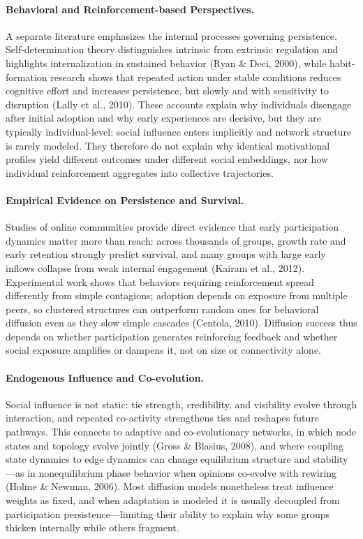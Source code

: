 \documentclass[11pt]{article}
\begin{document}
\paragraph{Behavioral and Reinforcement-based Perspectives.}
A separate literature emphasizes the internal processes governing persistence. Self-determination theory distinguishes intrinsic from extrinsic regulation and highlights internalization in sustained behavior (Ryan \& Deci, 2000), while habit-formation research shows that repeated action under stable conditions reduces cognitive effort and increases persistence, but slowly and with sensitivity to disruption (Lally et al., 2010). These accounts explain why individuals disengage after initial adoption and why early experiences are decisive, but they are typically individual-level: social influence enters implicitly and network structure is rarely modeled. They therefore do not explain why identical motivational profiles yield different outcomes under different social embeddings, nor how individual reinforcement aggregates into collective trajectories.

\paragraph{Empirical Evidence on Persistence and Survival.}
Studies of online communities provide direct evidence that early participation dynamics matter more than reach: across thousands of groups, growth rate and early retention strongly predict survival, and many groups with large early inflows collapse from weak internal engagement (Kairam et al., 2012). Experimental work shows that behaviors requiring reinforcement spread differently from simple contagions; adoption depends on exposure from multiple peers, so clustered structures can outperform random ones for behavioral diffusion even as they slow simple cascades (Centola, 2010). Diffusion success thus depends on whether participation generates reinforcing feedback and whether social exposure amplifies or dampens it, not on size or connectivity alone.

\paragraph{Endogenous Influence and Co-evolution.}
Social influence is not static: tie strength, credibility, and visibility evolve through interaction, and repeated co-activity strengthens ties and reshapes future pathways. This connects to adaptive and co-evolutionary networks, in which node states and topology evolve jointly (Gross \& Blasius, 2008), and where coupling state dynamics to edge dynamics can change equilibrium structure and stability---as in nonequilibrium phase behavior when opinions co-evolve with rewiring (Holme \& Newman, 2006). Most diffusion models nonetheless treat influence weights as fixed, and when adaptation is modeled it is usually decoupled from participation persistence---limiting their ability to explain why some groups thicken internally while others fragment.
\end{document}
